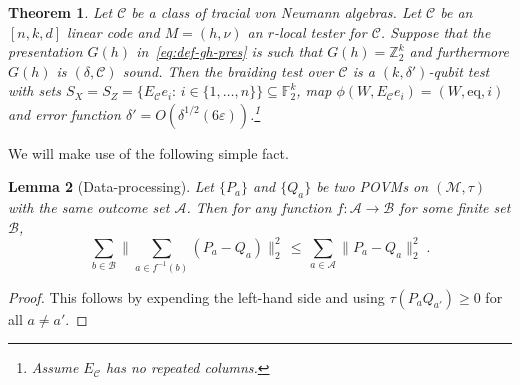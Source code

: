 \documentclass[11pt]{article}
\newtheorem{theorem}{Theorem}[section]
\newtheorem{lemma}[theorem]{Lemma}
\theoremstyle{definition}
\newcommand{\code}{\mathscr{C}}
\newcommand{\field}{\mathbb{F}_2}
\newcommand{\Z}{\ensuremath{\mathbb{Z}}}
\newcommand{\mA}{\ensuremath{\mathcal{A}}}
\newcommand{\mB}{\ensuremath{\mathcal{B}}}
\newcommand{\mC}{\ensuremath{\mathcal{C}}}
\newcommand{\mM}{\ensuremath{\mathcal{M}}}
\newcommand{\eps}{\varepsilon}
\newcommand{\eq}{\mathrm{eq}}
\begin{document}
\begin{theorem}\label{thm:braiding}
Let $\mC$ be a class of tracial von Neumann algebras. Let $\code$ be an $[n,k,d]$ linear code and $M=(h,\nu)$ an $r$-local tester for $\code$. Suppose that the presentation $G(h)$ in~\eqref{eq:def-gh-pres} is such that $G(h)=\Z_2^k$ and furthermore $G(h)$ is $(\delta,\mC)$ sound. Then the braiding test over $\code$ is a $(k,\delta')$-qubit test with sets $S_X=S_Z=\{E_\code e_i:\,i\in\{1,\ldots,n\}\}\subseteq \field^k$, map $\phi(W,E_\code e_i)=(W,\eq,i)$ and error function $\delta' = O(\delta^{1/2}(6\eps))$.\footnote{Assume $E_\code$ has no repeated columns.} 
\end{theorem}



We will make use of the following simple fact. 


\begin{lemma}[Data-processing]\label{lem:dp}
Let $\{P_a\}$ and $\{Q_a\}$ be two POVMs on $(\mM,\tau)$ with the same outcome set $\mA$. Then for any function $f:\mA\to \mB$ for some finite set $\mB$, 
\begin{equation}\label{eq:dp}
\sum_{b\in \mB} \Big\| \sum_{a\in f^{-1}(b)} (P_a-Q_a) \Big\|_2^2 \,\leq\, \sum_{a\in \mA} \big\| P_a-Q_a\big\|_2^2\;.
\end{equation}
\end{lemma}

\begin{proof}
This follows by expending the left-hand side and using $\tau(P_aQ_{a'})\geq 0$ for all $a\neq a'$. 
\end{proof}
\end{document}

